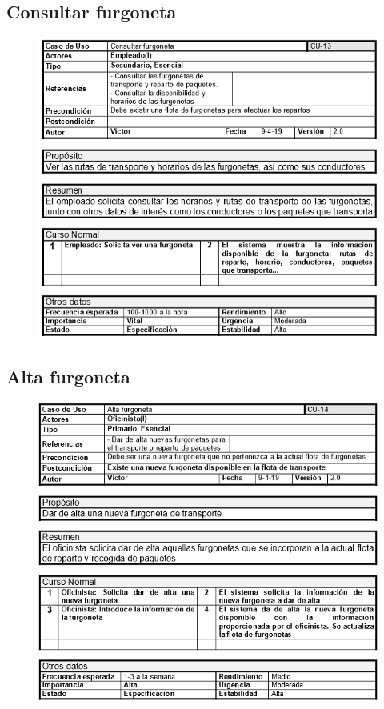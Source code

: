 \subsection{Consultar furgoneta}
\begin{figure}[H]
	\centering
	\includegraphics[width=16cm]{13}
\end{figure}
\subsection{Alta furgoneta}
\begin{figure}[H]
	\centering
	\includegraphics[width=16cm]{14}
\end{figure}
